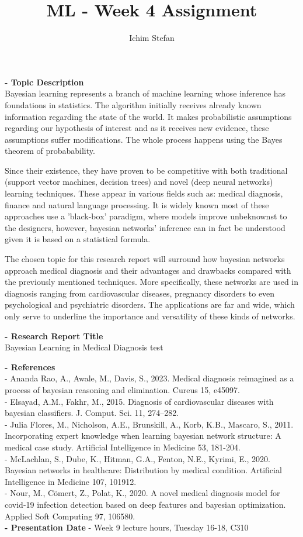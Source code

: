 \documentclass[0.5p,a4paper]{article}
\begin{document}
\author{Ichim Stefan}
\title{\textbf{ML - Week 4 Assignment}}
\maketitle

\textbf{- Topic Description} \\
Bayesian learning represents a branch of machine learning whose
inference has foundations in statistics. The algorithm 
initially receives already known information regarding 
the state of the world. It makes probabilistic assumptions
regarding our hypothesis of interest and as it receives new
evidence, these assumptions suffer modifications. The whole
process happens using the Bayes theorem of probabability.

Since their existence, they have proven to be competitive
with both traditional (support vector machines, decision
trees) and novel (deep neural networks) learning techniques.
These appear in various fields such as: medical diagnosis, 
finance and natural language processing. It is widely known
most of these approaches use a 'black-box' paradigm,
where models improve unbeknownst to the designers,
however, bayesian networks' inference can in fact be understood
given it is based on a statistical formula.

The chosen topic for this research report will surround how
bayesian networks approach medical diagnosis and their
advantages and drawbacks compared with the previously
mentioned techniques. More specifically, these networks
are used in diagnosis ranging from cardiovascular diseases,
pregnancy disorders to even psychological and psychiatric
disorders. The applications are far and wide, which only
serve to underline the importance and versatility of these
kinds of networks.

\textbf{- Research Report Title} \\
Bayesian Learning in Medical Diagnosis test

\textbf{- References} \\
  - Ananda Rao, A., Awale, M., Davis, S., 2023. Medical diagnosis reimagined as a process of bayesian reasoning and elimination. Cureus 15, e45097. \\
  - Elsayad, A.M., Fakhr, M., 2015. Diagnosis of cardiovascular diseases with bayesian classifiers. J. Comput. Sci. 11, 274–282. \\
  - Julia Flores, M., Nicholson, A.E., Brunskill, A., Korb, K.B., Mascaro, S., 2011. Incorporating expert knowledge when learning bayesian network structure: A medical case study. Artificial Intelligence in Medicine 53, 181-204. \\
  - McLachlan, S., Dube, K., Hitman, G.A., Fenton, N.E., Kyrimi, E., 2020. Bayesian networks in healthcare: Distribution by medical condition. Artificial Intelligence in Medicine 107, 101912. \\
  - Nour, M., Cömert, Z., Polat, K., 2020. A novel medical diagnosis model for covid-19 infection detection based on deep features and bayesian optimization. Applied Soft Computing 97, 106580. \\

\textbf{- Presentation Date} - Week 9 lecture hours, Tuesday 16-18, C310
\end{document}
